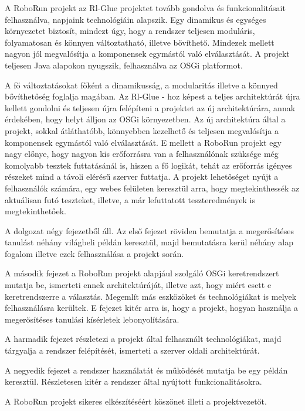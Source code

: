 	A RoboRun projekt az Rl-Glue projektet tovább gondolva és funkcionalitásait felhasználva, napjaink technológiáin alapszik. Egy dinamikus és egységes környezetet biztosít, mindezt úgy, hogy a rendszer teljesen moduláris, folyamatosan és könnyen változtatható, illetve bővíthető. Mindezek mellett nagyon jól megvalósítja a komponensek egymástól való elválasztását. A projekt teljesen Java alapokon nyugszik, felhasználva az OSGi platformot. 
	
	A fő változtatásokat főként a dinamikusság, a modularitás illetve a könnyed bővíthetőség foglalja magában. Az Rl-Glue - hoz képest a teljes architektúrát újra kellett gondolni és teljesen újra felépíteni a projektet az új architektúrára, annak érdekében, hogy helyt álljon az OSGi környezetben. Az új architektúra által a projekt, sokkal átláthatóbb, könnyebben kezelhető és teljesen megvalósítja a komponensek egymástól való elválasztását. E mellett a RoboRun projekt egy nagy előnye, hogy nagyon kis erőforrásra van a felhasználónak szüksége még komolyabb tesztek futtatásánál is, hiszen a fő logikát, tehát az erőforrás igényes részeket mind a távoli elérésű szerver futtatja. A projekt lehetőséget nyújt a felhasználók számára, egy webes felületen keresztül arra, hogy megtekinthessék az aktuálisan futó teszteket, illetve, a már lefuttatott teszteredmények is megtekinthetőek.
	
	A dolgozat négy fejezetből áll. Az első fejezet röviden bemutatja a megerősítéses tanulást néhány világbeli példán keresztül, majd bemutatásra kerül néhány alap fogalom illetve ezek felhasználása a projekt során.
	
	A második fejezet a RoboRun projekt alapjául szolgáló OSGi keretrendszert mutatja be, ismerteti ennek architektúráját, illetve azt, hogy  miért esett e keretrendszerre a választás. Megemlít más eszközöket és technológiákat is melyek felhasználásra kerültek. E fejezet kitér arra is, hogy a projekt, hogyan használja a megerősítéses tanulási kísérletek lebonyolítására.
	
	A harmadik fejezet részletezi a projekt által felhasznált technológiákat, majd tárgyalja a rendszer felépítését, ismerteti a szerver oldali architektúrát. 
	
	A negyedik fejezet a rendszer használatát és működését mutatja be egy példán keresztül. Részletesen kitér a rendszer által nyújtott funkcionalitásokra. 
	
	A RoboRun projekt sikeres elkészítéséért köszönet illeti a projektvezetőt.
